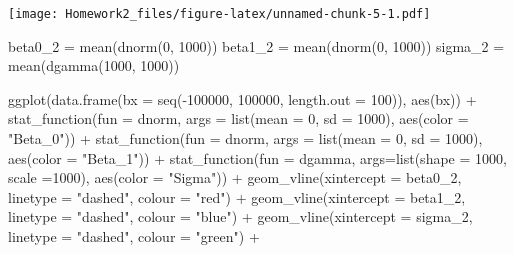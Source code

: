 \documentclass[
]{article}
\newenvironment{Shaded}{\begin{snugshade}}{\end{snugshade}}
\newcommand{\AttributeTok}[1]{\textcolor[rgb]{0.77,0.63,0.00}{#1}}
\newcommand{\DecValTok}[1]{\textcolor[rgb]{0.00,0.00,0.81}{#1}}
\newcommand{\FunctionTok}[1]{\textcolor[rgb]{0.00,0.00,0.00}{#1}}
\newcommand{\NormalTok}[1]{#1}
\newcommand{\OtherTok}[1]{\textcolor[rgb]{0.56,0.35,0.01}{#1}}
\newcommand{\SpecialCharTok}[1]{\textcolor[rgb]{0.00,0.00,0.00}{#1}}
\newcommand{\StringTok}[1]{\textcolor[rgb]{0.31,0.60,0.02}{#1}}
\begin{document}
\texttt{[image: Homework2\_files/figure-latex/unnamed-chunk-5-1.pdf]}

\begin{Shaded}
\begin{Highlighting}[]
\NormalTok{beta0\_2 }\OtherTok{=} \FunctionTok{mean}\NormalTok{(}\FunctionTok{dnorm}\NormalTok{(}\DecValTok{0}\NormalTok{, }\DecValTok{1000}\NormalTok{))}
\NormalTok{beta1\_2 }\OtherTok{=} \FunctionTok{mean}\NormalTok{(}\FunctionTok{dnorm}\NormalTok{(}\DecValTok{0}\NormalTok{, }\DecValTok{1000}\NormalTok{))}
\NormalTok{sigma\_2 }\OtherTok{=} \FunctionTok{mean}\NormalTok{(}\FunctionTok{dgamma}\NormalTok{(}\DecValTok{1000}\NormalTok{, }\DecValTok{1000}\NormalTok{))}

\FunctionTok{ggplot}\NormalTok{(}\FunctionTok{data.frame}\NormalTok{(}\AttributeTok{bx =} \FunctionTok{seq}\NormalTok{(}\SpecialCharTok{{-}}\DecValTok{100000}\NormalTok{, }\DecValTok{100000}\NormalTok{, }\AttributeTok{length.out =} \DecValTok{100}\NormalTok{)), }\FunctionTok{aes}\NormalTok{(bx)) }\SpecialCharTok{+}
  \FunctionTok{stat\_function}\NormalTok{(}\AttributeTok{fun =}\NormalTok{ dnorm, }\AttributeTok{args =} \FunctionTok{list}\NormalTok{(}\AttributeTok{mean =} \DecValTok{0}\NormalTok{, }\AttributeTok{sd =} \DecValTok{1000}\NormalTok{), }\FunctionTok{aes}\NormalTok{(}\AttributeTok{color =} \StringTok{"Beta\_0"}\NormalTok{)) }\SpecialCharTok{+} 
  \FunctionTok{stat\_function}\NormalTok{(}\AttributeTok{fun =}\NormalTok{ dnorm, }\AttributeTok{args =} \FunctionTok{list}\NormalTok{(}\AttributeTok{mean =} \DecValTok{0}\NormalTok{, }\AttributeTok{sd =} \DecValTok{1000}\NormalTok{), }\FunctionTok{aes}\NormalTok{(}\AttributeTok{color =} \StringTok{"Beta\_1"}\NormalTok{)) }\SpecialCharTok{+} 
  \FunctionTok{stat\_function}\NormalTok{(}\AttributeTok{fun =}\NormalTok{ dgamma, }\AttributeTok{args=}\FunctionTok{list}\NormalTok{(}\AttributeTok{shape =} \DecValTok{1000}\NormalTok{, }\AttributeTok{scale =}\DecValTok{1000}\NormalTok{), }\FunctionTok{aes}\NormalTok{(}\AttributeTok{color =} \StringTok{"Sigma"}\NormalTok{)) }\SpecialCharTok{+}
  \FunctionTok{geom\_vline}\NormalTok{(}\AttributeTok{xintercept =}\NormalTok{ beta0\_2, }\AttributeTok{linetype =} \StringTok{"dashed"}\NormalTok{, }\AttributeTok{colour =} \StringTok{"red"}\NormalTok{) }\SpecialCharTok{+}
  \FunctionTok{geom\_vline}\NormalTok{(}\AttributeTok{xintercept =}\NormalTok{ beta1\_2, }\AttributeTok{linetype =} \StringTok{"dashed"}\NormalTok{, }\AttributeTok{colour =} \StringTok{"blue"}\NormalTok{) }\SpecialCharTok{+}
  \FunctionTok{geom\_vline}\NormalTok{(}\AttributeTok{xintercept =}\NormalTok{ sigma\_2, }\AttributeTok{linetype =} \StringTok{"dashed"}\NormalTok{, }\AttributeTok{colour =} \StringTok{"green"}\NormalTok{) }\SpecialCharTok{+}

\end{Highlighting}
\end{Shaded}
\end{document}
